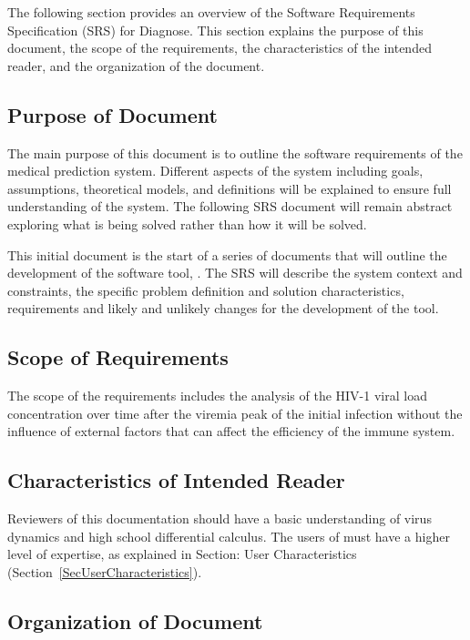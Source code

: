 \documentclass[12pt]{article}
\begin{document}
The following section provides an overview of the Software Requirements 
Specification (SRS) for Diagnose. This section explains the purpose of 
this document, the scope of the requirements, the characteristics of the 
intended reader, and the organization of the document.



\subsection{Purpose of Document}

The main purpose of this document is to outline the software requirements of the 
medical prediction system. Different aspects of the system including goals, 
assumptions, theoretical models, and definitions will be explained to ensure 
full understanding of the system. The following SRS document will remain 
abstract exploring what is being solved rather than how it will be solved.

This initial document is the start of a series of documents that will 
outline the development of the software tool, \progname{}. The SRS will 
describe the system context and constraints, the specific problem definition and 
solution characteristics, requirements and likely and unlikely changes for the 
development of the tool.


\subsection{Scope of Requirements} 

The scope of the requirements includes the analysis of the HIV-1 viral load 
concentration 
over time after the viremia peak of the initial infection without the influence 
of external factors that can affect the efficiency of the immune system.



\subsection{Characteristics of Intended Reader} \label{sec_IntendedReader}

Reviewers of this documentation should have a basic understanding of virus 
dynamics and high school differential calculus. The users of \progname{} must 
have a 
higher level of expertise, as explained in Section: User Characteristics
(Section~\ref{SecUserCharacteristics}). 



\subsection{Organization of Document}
\end{document}
